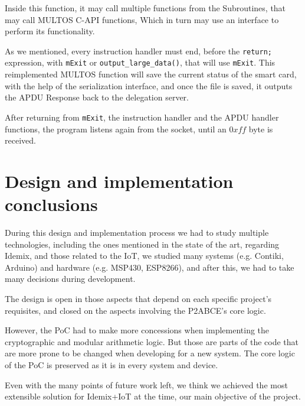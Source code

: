 Inside this function, it may call multiple functions from the Subroutines, that may call MULTOS C-API functions, Which in turn may use an interface to perform its functionality.


As we mentioned, every instruction handler must end, before the \texttt{return;} expression, with \texttt{mExit} or  \texttt{output\_large\_data()}, that will use \texttt{mExit}. This reimplemented MULTOS function will save the current status of the smart card, with the help of the serialization interface, and once the file is saved, it outputs the APDU Response back to the delegation server.

After returning from \texttt{mExit}, the instruction handler and the APDU handler functions, the program listens again from the socket, until an $0xff$ byte is received.





\section{Design and implementation conclusions}

During this design and implementation process we had to study multiple technologies, including the ones mentioned in the state of the art, regarding Idemix, and those related to the IoT, we studied many systems (e.g. Contiki, Arduino) and hardware (e.g. MSP430, ESP8266), and after this, we had to take many decisions during development.

The design is open in those aspects that depend on each specific project's requisites, and closed on the aspects involving the P2ABCE's core logic.

However, the PoC had to make more concessions when implementing the cryptographic and modular arithmetic logic. But those are parts of the code that are more prone to be changed when developing for a new system. The core logic of the PoC is preserved as it is in every system and device.


Even with the many points of future work left, we think we achieved the most extensible solution for Idemix+IoT at the time, our main objective of the project.
